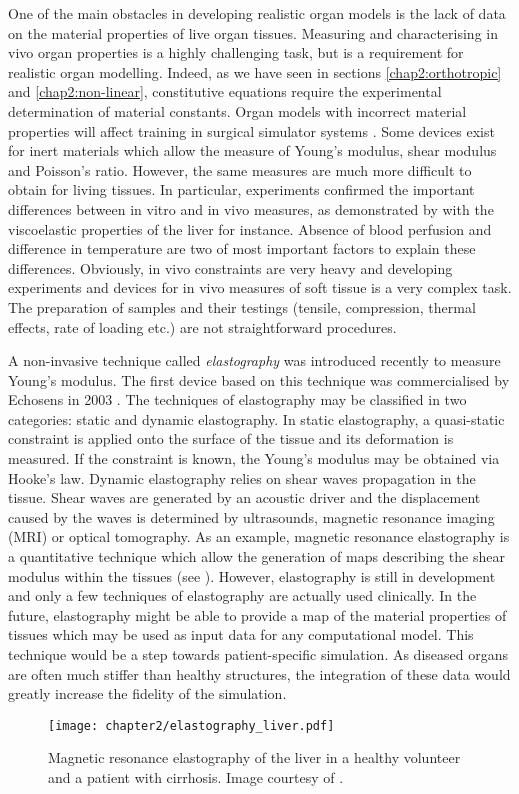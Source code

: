 \OFF One of the main obstacles in developing realistic organ models is the lack of data on the material properties of live organ tissues. Measuring and characterising in vivo organ properties is a highly challenging task, but is a requirement for realistic organ modelling. Indeed, as we have seen in sections \ref{chap2:orthotropic} and \ref{chap2:non-linear}, constitutive equations require the experimental determination of material constants. Organ models with incorrect material properties will affect training in surgical simulator systems \citep{Sedef06}. \ON Some devices exist for inert materials which allow the measure of Young's modulus, shear modulus and Poisson's ratio. However, the same measures are much more difficult to obtain for living tissues. In particular, experiments confirmed the important differences between in vitro and in vivo measures, as demonstrated by \cite{Kerdok06} with the viscoelastic properties of the liver for instance. Absence of blood perfusion and difference in temperature are two of most important factors to explain these differences. Obviously, in vivo constraints are very heavy and developing experiments and devices for in vivo measures of soft tissue is a very complex task. The preparation of samples and their testings (tensile, compression, thermal effects, rate of loading etc.) are not straightforward procedures.

A non-invasive technique called \emph{elastography} was introduced recently to measure Young's modulus. The first device based on this technique was commercialised by Echosens in 2003 \cite{Bastard09}. The techniques of elastography may be classified in two categories: static and dynamic elastography. In static elastography, a quasi-static constraint is applied onto the surface of the tissue and its deformation is measured. If the constraint is known, the Young's modulus may be obtained via Hooke's law. Dynamic elastography relies on shear waves propagation in the tissue. Shear waves are generated by an acoustic driver and the displacement caused by the waves is determined by ultrasounds, magnetic resonance imaging (MRI) or optical tomography. As an example, magnetic resonance elastography is a quantitative technique which allow the generation of maps describing the shear modulus within the tissues (see ). However, elastography is still in development and only a few techniques of elastography are actually used clinically. In the future, elastography might be able to provide a map of the material properties of tissues which may be used as input data for any computational model. This technique would be a step towards patient-specific simulation. As diseased organs are often much stiffer than healthy structures, the integration of these data would greatly increase the fidelity of the simulation.
%
\begin{figure}
\centering
\texttt{[image: chapter2/elastography\_liver.pdf]}
\caption {\ON Magnetic resonance elastography of the liver in a healthy volunteer and a patient with cirrhosis. Image courtesy of \cite{Talwalkar07}.}
\label{chap2:fig-elastography_liver}
\end{figure}


